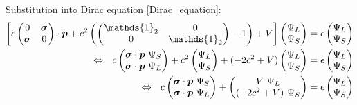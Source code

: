 	Substitution into Dirac equation \eqref{Dirac_equation}: 
	\begin{align}
		\left[
			c 
			\begin{pmatrix}
			0 & \boldsymbol{\sigma} \\
			\boldsymbol{\sigma} & 0 
			\end{pmatrix}
			\cdot \p
			+ c^2
			\left(
				\begin{pmatrix}
					\mathds{1}_2 & 0 \\
					0 & \mathds{1}_2
				\end{pmatrix} 
				- 1
			\right)
			+ V
		\right] 
		\begin{pmatrix}
			\Psi_L \\
			\Psi_S
		\end{pmatrix} 
		&= \epsilon 
		\begin{pmatrix}
			\Psi_L \\
			\Psi_S
		\end{pmatrix} \\	%
		\Leftrightarrow ~~
		c
		\begin{pmatrix}
			\boldsymbol{\sigma} \cdot \p ~\Psi_S \\
			\boldsymbol{\sigma} \cdot \p ~\Psi_L
		\end{pmatrix}
		+
		c^2
		\begin{pmatrix}
			\Psi_L \\
			\Psi_S
		\end{pmatrix}
		+
		(-2c^2 +V)
		\begin{pmatrix}
			\Psi_L \\
			\Psi_S
		\end{pmatrix}
		&= \epsilon 
		\begin{pmatrix}
			\Psi_L \\
			\Psi_S
		\end{pmatrix} \\ %
		\Leftrightarrow~~
		c
		\begin{pmatrix}
			\boldsymbol{\sigma} \cdot \p ~\Psi_S \\
			\boldsymbol{\sigma} \cdot \p ~\Psi_L
		\end{pmatrix}
		+
		\begin{pmatrix}
			V~\Psi_L \\
			(-2c^2+V)~\Psi_S
		\end{pmatrix}
		&= \epsilon 
		\begin{pmatrix}
			\Psi_L \\
			\Psi_S
		\end{pmatrix}
	\end{align}
